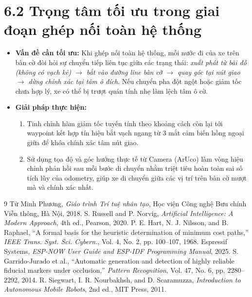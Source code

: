 \documentclass[14pt,a4paper]{extreport}
\begin{document}
\section*{6.2 Trọng tâm tối ưu trong giai đoạn ghép nối toàn hệ thống}
\begin{itemize}
    \item \textbf{Vấn đề cần tối ưu:} Khi ghép nối toàn hệ thống, mỗi nước đi của xe trên bàn cờ đòi hỏi sự chuyển tiếp liên tục giữa các trạng thái: \textit{xuất phát từ bãi đỗ (không có vạch kẻ) $\rightarrow$ bắt vào đường line bàn cờ $\rightarrow$ quay góc tại nút giao $\rightarrow$ dừng chính xác tại tâm ô đích}. Nếu chuyển pha đột ngột hoặc giảm tốc chưa hợp lý, xe có thể bị trượt quán tính nhẹ làm lệch tâm ô cờ.
    \item \textbf{Giải pháp thực hiện:}
    \begin{enumerate}
        \item Tinh chỉnh hàm giảm tốc tuyến tính theo khoảng cách còn lại tới waypoint kết hợp tín hiệu bắt vạch ngang từ 3 mắt cảm biến hồng ngoại giữa để khóa chính xác tâm nút giao.
        \item Sử dụng tọa độ và góc hướng thực tế từ Camera (ArUco) làm vòng hiệu chỉnh phản hồi sau mỗi bước di chuyển nhằm triệt tiêu hoàn toàn sai số tích lũy của odometry, giúp xe di chuyển giữa các vị trí trên bàn cờ mượt mà và chính xác nhất.
    \end{enumerate}
\end{itemize}
 

\renewcommand{\bibname}{TÀI LIỆU THAM KHẢO}
\begin{thebibliography}{9}
     Từ Minh Phương, \textit{Giáo trình Trí tuệ nhân tạo}, Học viện Công nghệ Bưu chính Viễn thông, Hà Nội, 2018.
     S. Russell and P. Norvig, \textit{Artificial Intelligence: A Modern Approach}, 4th ed., Pearson, 2020.
     P. E. Hart, N. J. Nilsson, and B. Raphael, ``A formal basis for the heuristic determination of minimum cost paths,'' \textit{IEEE Trans. Syst. Sci. Cybern.}, Vol. 4, No. 2, pp. 100--107, 1968.
     Espressif Systems, \textit{ESP-NOW User Guide and ESP-IDF Programming Manual}, 2025.
     S. Garrido-Jurado et al., ``Automatic generation and detection of highly reliable fiducial markers under occlusion,'' \textit{Pattern Recognition}, Vol. 47, No. 6, pp. 2280--2292, 2014.
     R. Siegwart, I. R. Nourbakhsh, and D. Scaramuzza, \textit{Introduction to Autonomous Mobile Robots}, 2nd ed., MIT Press, 2011.
\end{thebibliography}
 
\end{document}
